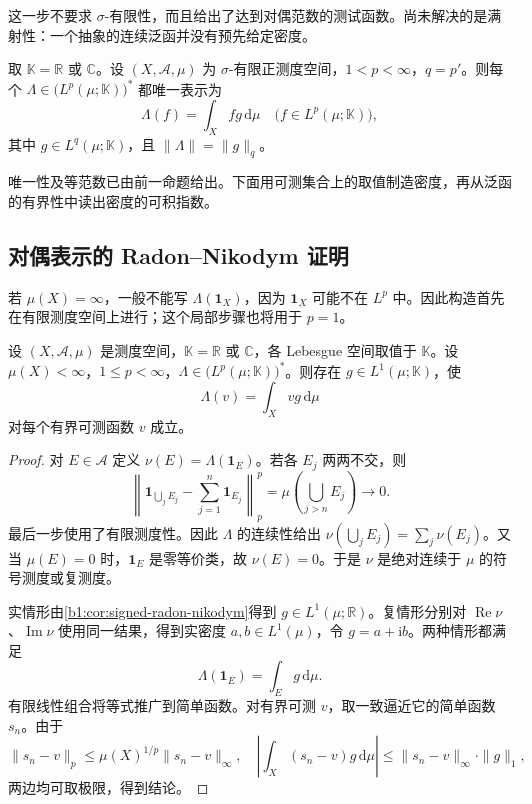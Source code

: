 这一步不要求 \(\sigma\)-有限性，而且给出了达到对偶范数的测试函数。尚未解决的是满射性：一个抽象的连续泛函并没有预先给定密度。

\begin{theorem}[\(L^p\) 对偶表示]\label{b1:thm:lp-dual}
取 \(\mathbb K=\mathbb R\) 或 \(\mathbb C\)。设 \((X,\mathcal A,\mu)\) 为 \(\sigma\)-有限正测度空间，\(1<p<\infty\)，\(q=p'\)。则每个 \(\Lambda\in\bigl(L^p(\mu;\mathbb K)\bigr)^*\) 都唯一表示为
\[
 \Lambda(f)=\int_Xfg\,\mathrm d\mu
 \quad\bigl(f\in L^p(\mu;\mathbb K)\bigr),
\]
其中 \(g\in L^q(\mu;\mathbb K)\)，且 \(\|\Lambda\|=\|g\|_q\)。
\end{theorem}

唯一性及等范数已由前一命题给出。下面用可测集合上的取值制造密度，再从泛函的有界性中读出密度的可积指数。

\subsection{对偶表示的 Radon--Nikodym 证明}
\label{b1:subsec:100302}

若 \(\mu(X)=\infty\)，一般不能写 \(\Lambda(\mathbf1_X)\)，因为 \(\mathbf1_X\) 可能不在 \(L^p\) 中。因此构造首先在有限测度空间上进行；这个局部步骤也将用于 \(p=1\)。

\begin{lemma}\label{b1:lem:lp-functional-local-density}
设 \((X,\mathcal A,\mu)\) 是测度空间，\(\mathbb K=\mathbb R\) 或 \(\mathbb C\)，各 Lebesgue 空间取值于 \(\mathbb K\)。设 \(\mu(X)<\infty\)，\(1\le p<\infty\)，\(\Lambda\in\bigl(L^p(\mu;\mathbb K)\bigr)^*\)。则存在 \(g\in L^1(\mu;\mathbb K)\)，使
\[
 \Lambda(v)=\int_Xvg\,\mathrm d\mu
\]
对每个有界可测函数 \(v\) 成立。
\end{lemma}
\begin{proof}
对 \(E\in\mathcal A\) 定义 \(\nu(E)=\Lambda(\mathbf1_E)\)。若各 \(E_j\) 两两不交，则
\[
 \left\|\mathbf1_{\bigcup_jE_j}-\sum_{j=1}^n\mathbf1_{E_j}\right\|_p^p
 =\mu\left(\bigcup_{j>n}E_j\right)\longrightarrow0.
\]
最后一步使用了有限测度性。因此 \(\Lambda\) 的连续性给出
\(\nu(\bigcup_jE_j)=\sum_j\nu(E_j)\)。又当 \(\mu(E)=0\) 时，\(\mathbf1_E\) 是零等价类，故 \(\nu(E)=0\)。于是 \(\nu\) 是绝对连续于 \(\mu\) 的符号测度或复测度。

实情形由\cref{b1:cor:signed-radon-nikodym}得到 \(g\in L^1(\mu;\mathbb R)\)。复情形分别对 \(\operatorname{Re}\nu\)、\(\operatorname{Im}\nu\) 使用同一结果，得到实密度 \(a,b\in L^1(\mu)\)，令 \(g=a+\mathrm i b\)。两种情形都满足
\[
 \Lambda(\mathbf1_E)=\int_Eg\,\mathrm d\mu.
\]
有限线性组合将等式推广到简单函数。对有界可测 \(v\)，取一致逼近它的简单函数 \(s_n\)。由于
\[
 \|s_n-v\|_p\le\mu(X)^{1/p}\|s_n-v\|_\infty,
 \quad
 \left|\int_X(s_n-v)g\,\mathrm d\mu\right|
 \le\|s_n-v\|_\infty\cdot\|g\|_1,
\]
两边均可取极限，得到结论。
\end{proof}

